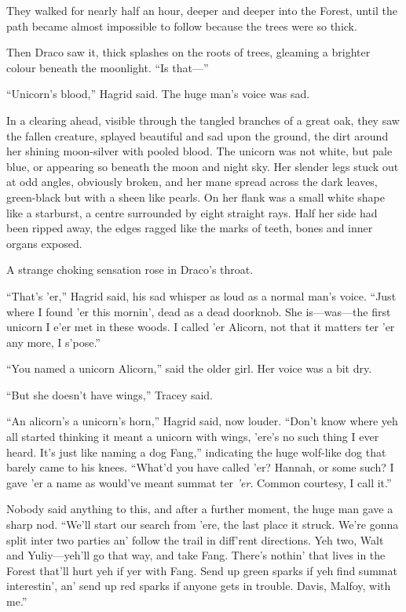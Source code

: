 They walked for nearly half an hour, deeper and deeper into the Forest, until the path became almost impossible to follow because the trees were so thick.

Then Draco saw it, thick splashes on the roots of trees, gleaming a brighter colour beneath the moonlight. “Is that—”

“Unicorn’s blood,” Hagrid said. The huge man’s voice was sad.

In a clearing ahead, visible through the tangled branches of a great oak, they saw the fallen creature, splayed beautiful and sad upon the ground, the dirt around her shining moon-silver with pooled blood. The unicorn was not white, but pale blue, or appearing so beneath the moon and night sky. Her slender legs stuck out at odd angles, obviously broken, and her mane spread across the dark leaves, green-black but with a sheen like pearls. On her flank was a small white shape like a starburst, a centre surrounded by eight straight rays. Half her side had been ripped away, the edges ragged like the marks of teeth, bones and inner organs exposed.

A strange choking sensation rose in Draco’s throat.

“That’s ’er,” Hagrid said, his sad whisper as loud as a normal man’s voice. “Just where I found ’er this mornin’, dead as a dead doorknob. She is—was—the first unicorn I e’er met in these woods. I called ’er Alicorn, not that it matters ter ’er any more, I s’pose.”

“You named a unicorn Alicorn,” said the older girl. Her voice was a bit dry.

“But she doesn’t have wings,” Tracey said.

“An alicorn’s a unicorn’s horn,” Hagrid said, now louder. “Don’t know where yeh all started thinking it meant a unicorn with wings, ’ere’s no such thing I ever heard. It’s just like naming a dog Fang,” indicating the huge wolf-like dog that barely came to his knees. “What’d you have called ’er? Hannah, or some such? I gave ’er a name as would’ve meant summat ter \emph{’er}. Common courtesy, I call it.”

Nobody said anything to this, and after a further moment, the huge man gave a sharp nod. “We’ll start our search from ’ere, the last place it struck. We’re gonna split inter two parties an’ follow the trail in diff’rent directions. Yeh two, Walt and Yuliy—yeh’ll go that way, and take Fang. There’s nothin’ that lives in the Forest that’ll hurt yeh if yer with Fang. Send up green sparks if yeh find summat interestin’, an’ send up red sparks if anyone gets in trouble. Davis, Malfoy, with me.”

